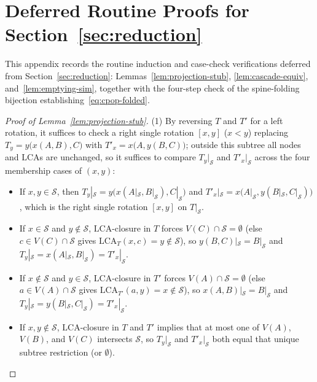 \documentclass[11pt]{article}
\theoremstyle{definition}
\theoremstyle{remark}
\newcommand{\LCA}{\mathrm{LCA}}
\begin{document}
\section{Deferred Routine Proofs for Section~\ref{sec:reduction}}
\label{app:reduction-proofs}

This appendix records the routine induction and case-check verifications deferred from Section~\ref{sec:reduction}: Lemmas~\ref{lem:projection-stub}, \ref{lem:cascade-equiv}, and~\ref{lem:emptying-sim}, together with the four-step check of the spine-folding bijection establishing~\eqref{eq:cpop-folded}.

\begin{proof}[Proof of Lemma~\ref{lem:projection-stub}]
(1) By reversing $T$ and $T'$ for a left rotation, it suffices to check a right single rotation $[x, y]$ ($x < y$) replacing $T_y = y\big(x(A, B), C\big)$ with $T'_x = x\big(A, y(B, C)\big)$; outside this subtree all nodes and $\LCA$s are unchanged, so it suffices to compare $T_y|_{\mathcal{S}}$ and $T'_x|_{\mathcal{S}}$ across the four membership cases of $(x, y)$:
\begin{itemize}[leftmargin=2em]
  \item If $x, y \in \mathcal{S}$, then $T_y|_{\mathcal{S}} = y\big(x(A|_{\mathcal{S}}, B|_{\mathcal{S}}), C|_{\mathcal{S}}\big)$ and $T'_x|_{\mathcal{S}} = x\big(A|_{\mathcal{S}}, y(B|_{\mathcal{S}}, C|_{\mathcal{S}})\big)$, which is the right single rotation $[x, y]$ on $T|_{\mathcal{S}}$.
  \item If $x \in \mathcal{S}$ and $y \notin \mathcal{S}$, $\LCA$-closure in $T$ forces $V(C) \cap \mathcal{S} = \emptyset$ (else $c \in V(C) \cap \mathcal{S}$ gives $\LCA_T(x, c) = y \notin \mathcal{S}$), so $y(B, C)|_{\mathcal{S}} = B|_{\mathcal{S}}$ and $T_y|_{\mathcal{S}} = x(A|_{\mathcal{S}}, B|_{\mathcal{S}}) = T'_x|_{\mathcal{S}}$.
  \item If $x \notin \mathcal{S}$ and $y \in \mathcal{S}$, $\LCA$-closure in $T'$ forces $V(A) \cap \mathcal{S} = \emptyset$ (else $a \in V(A) \cap \mathcal{S}$ gives $\LCA_{T'}(a, y) = x \notin \mathcal{S}$), so $x(A, B)|_{\mathcal{S}} = B|_{\mathcal{S}}$ and $T_y|_{\mathcal{S}} = y(B|_{\mathcal{S}}, C|_{\mathcal{S}}) = T'_x|_{\mathcal{S}}$.
  \item If $x, y \notin \mathcal{S}$, $\LCA$-closure in $T$ and $T'$ implies that at most one of $V(A)$, $V(B)$, and $V(C)$ intersects $\mathcal{S}$, so $T_y|_{\mathcal{S}}$ and $T'_x|_{\mathcal{S}}$ both equal that unique subtree restriction (or $\emptyset$).
\end{itemize}


\end{proof}
\end{document}
